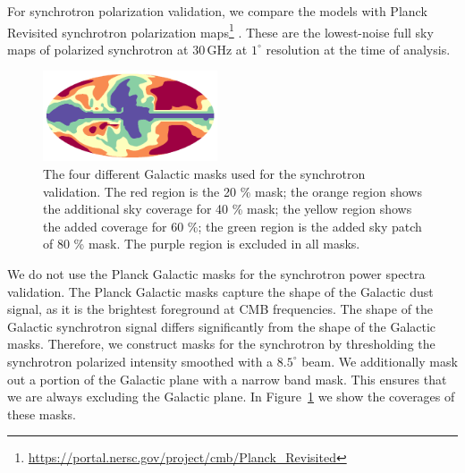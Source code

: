 \documentclass[twocolumn]{aastex631}
\begin{document}
For synchrotron polarization validation, we compare the models with Planck Revisited synchrotron polarization maps\footnote{\url{https://portal.nersc.gov/project/cmb/Planck\_Revisited}} \citep{Delabrouille:2024}. These are the lowest-noise full sky maps of polarized synchrotron at 30\,GHz at $1^\circ$ resolution at the time of analysis. 

\begin{figure}
    \centering
    \includegraphics[width=0.46\textwidth]{figures/SYNC_mask_stack.png}
    \caption{The four different Galactic masks used for the synchrotron validation. The red region is the 20 \% mask; the orange region shows the additional sky coverage for 40 \% mask; the yellow region shows the added coverage for 60 \%; the green region is the added sky patch of 80 \% mask. The purple region is excluded in all masks.}
    \label{fig:sync_masks}
\end{figure}

We do not use the Planck Galactic masks for the synchrotron power spectra validation. The Planck Galactic masks capture the shape of the Galactic dust signal, as it is the brightest foreground at CMB frequencies. The shape of the Galactic synchrotron signal differs significantly from the shape of the Galactic masks. Therefore, we construct masks for the synchrotron by thresholding the synchrotron polarized intensity smoothed with a $8.5^\circ$ beam. We additionally mask out a portion of the Galactic plane with a narrow band mask. This ensures that we are always excluding the Galactic plane. In Figure~\ref{fig:sync_masks} we show the coverages of these masks. 
\end{document}
